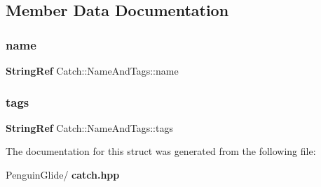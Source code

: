 \subsection{Member Data Documentation}
\mbox{\label{struct_catch_1_1_name_and_tags_a7cbea60e0cebfa622c667008eb011420}} 
\subsubsection{name}
{\footnotesize\ttfamily \textbf{ String\+Ref} Catch\+::\+Name\+And\+Tags\+::name}

\mbox{\label{struct_catch_1_1_name_and_tags_a74062ed1138834a348424eb7ed900c57}} 
\subsubsection{tags}
{\footnotesize\ttfamily \textbf{ String\+Ref} Catch\+::\+Name\+And\+Tags\+::tags}



The documentation for this struct was generated from the following file\+:\begin{DoxyCompactItemize}
\item 
Penguin\+Glide/\textbf{ catch.\+hpp}\end{DoxyCompactItemize}
